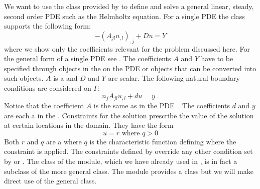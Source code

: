 We want to use the \LinearPDE class provided by \escript to define and solve a
general linear, steady, second order PDE such as the Helmholtz equation.
For a single PDE the \LinearPDE class supports the following form:
\begin{equation}\label{LINEARPDE.SINGLE.1 TUTORIAL}
-(A_{jl} u_{,l})_{,j}+D u = Y
\end{equation}
where we show only the coefficients relevant for the problem discussed here.
For the general form of a single PDE see .
The coefficients $A$ and $Y$ have to be specified through \Data objects in
the \Function on the PDE or objects that can be converted into such \Data objects.
$A$ is a \RankTwo and $D$ and $Y$ are scalar.
The following natural boundary conditions
are considered on $\Gamma$:
\begin{equation}\label{LINEARPDE.SINGLE.2 TUTORIAL}
n_{j}A_{jl} u_{,l}+d u= y  \;.
\end{equation}
Notice that the coefficient $A$ is the same as in the PDE~.
The coefficients $d$ and $y$ are each a \Scalar in the \FunctionOnBoundary.
Constraints for the solution prescribe the value of the
solution at certain locations in the domain. They have the form
\begin{equation}\label{LINEARPDE.SINGLE.3 TUTORIAL}
u=r \mbox{ where } q>0
\end{equation}
Both $r$ and $q$ are a \Scalar where $q$ is the characteristic function defining where the constraint is applied.
The constraints defined by  override any
other condition set by  or .
The \Poisson class of the \linearPDEs module, which we have already used in
, is in fact a subclass of the more general \LinearPDE class.
The \linearPDEs module provides a \Helmholtz class but we will make direct use
of the general \LinearPDE class.

